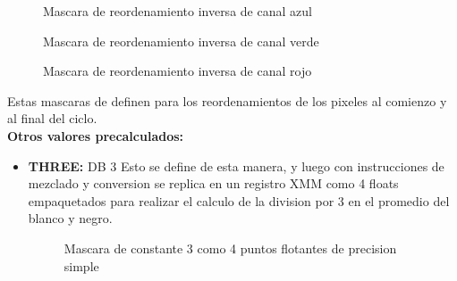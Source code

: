 \begin{itemize}
            \par      
            \bigskip
             \begin{figure}[!ht]
              \centering
              \caption{Mascara de reordenamiento inversa de canal azul}
            \end{figure}

            \par      
            \bigskip
             \begin{figure}[!ht]
              \centering
              \caption{Mascara de reordenamiento inversa de canal verde}
            \end{figure}

            \par      
            \bigskip
             \begin{figure}[!ht]
              \centering
              \caption{Mascara de reordenamiento inversa de canal rojo}
            \end{figure}            

        Estas mascaras de definen para los reordenamientos de los pixeles al comienzo y al final del ciclo.\\

        \textbf{Otros valores precalculados:}\\
      \begin{itemize}

        \item \textbf{THREE: } DB 3
        Esto se define de esta manera, y luego con instrucciones de mezclado y conversion se replica en un registro XMM como 4 floats empaquetados para realizar el calculo de la division por 3 en el promedio del blanco y negro.\\
            \par      
            \bigskip
             \begin{figure}[!ht]
              \centering
              \caption{Mascara de constante 3 como 4 puntos flotantes de precision simple}
            \end{figure}  


\end{itemize}
\end{itemize}
